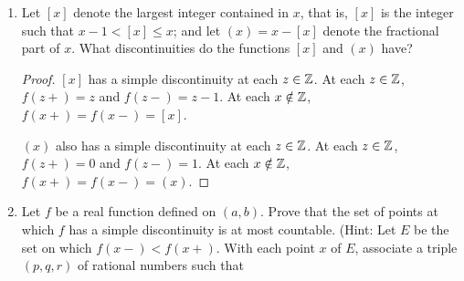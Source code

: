 \documentclass[../psets.tex]{subfiles}
\begin{document}
\begin{enumerate}[label={\textbf{\arabic*.}}]
\begin{proof}
        We will first prove that $f$ is 1-1. Suppose $x\neq y$, and WLOG let $x<y$. We seek to demonstrate that $f((x,y))=(c,d)$ where $c,d\in\R$ are distinct, and that $f([x,y])=[c,d]$; it will follow that $f(x)=c$ and $f(y)=d$ or vice versa, proving either way that $f(x)\neq f(y)$ as desired. Let's begin. To demonstrate the first claim, it will suffice to show that $f((x,y))$ is open, connected, and bounded. Since $f$ is open, $f((x,y))$ is open. Since $f$ is continuous and $(x,y)$ is connected, Theorem 4.22 asserts that $f((x,y))$ is connected. Since $f$ is continuous and $[x,y]$ is compact, Theorem 4.19 asserts that $f$ is uniformly continuous on $[x,y]$; hence $f$ is bounded on $(x,y)$ by Exercise 4.8, as desired. On the other hand, to demonstrate the second claim, it will suffice to show that $f([x,y])$ is compact and connected. Since $f$ is continuous and $[x,y]$ is compact, Theorem 4.14 implies that $f([x,y])$ is compact. Since $f$ is continuous and $[x,y]$ is connected, Theorem 4.22 implies that $f([x,y])$ is connected, as desired.\par
        Now suppose for the sake of contradiction that $f$ is not monotonic. Then there exist $x<y<z$ such that $f(x)<f(y)$ and $f(y)>f(z)$ (or, symmetrically, such that $f(x)>f(y)$ and $f(y)<f(z)$). Since $f$ is 1-1 and $x\neq z$, $f(x)\neq f(z)$. We divide into two cases ($f(x)<f(z)$ and $f(x)>f(z)$). If $f(x)<f(z)$, then $f(x)<f(z)<f(y)$ by hypothesis. Thus, since $f$ is a continuous real function on $[x,y]$ and $f(x)<f(z)<f(y)$, Theorem 4.23 asserts that there exists a $c\in(x,y)$ such that $f(c)=f(z)$. But since $f$ is 1-1, this implies that $c=z$, meaning that $x<z<y$, a contradiction. The proof of the other case is symmetric.
    \end{proof}
    \item Let $[x]$ denote the largest integer contained in $x$, that is, $[x]$ is the integer such that $x-1<[x]\leq x$; and let $(x)=x-[x]$ denote the fractional part of $x$. What discontinuities do the functions $[x]$ and $(x)$ have?
    \begin{proof}
        $[x]$ has a simple discontinuity at each $z\in\mathbb{Z}$. At each $z\in\mathbb{Z}$, $f(z+)=z$ and $f(z-)=z-1$. At each $x\notin\mathbb{Z}$, $f(x+)=f(x-)=[x]$.\par
        $(x)$ also has a simple discontinuity at each $z\in\mathbb{Z}$. At each $z\in\mathbb{Z}$, $f(z+)=0$ and $f(z-)=1$. At each $x\notin\mathbb{Z}$, $f(x+)=f(x-)=(x)$.
    \end{proof}
    \item Let $f$ be a real function defined on $(a,b)$. Prove that the set of points at which $f$ has a simple discontinuity is at most countable. (Hint: Let $E$ be the set on which $f(x-)<f(x+)$. With each point $x$ of $E$, associate a triple $(p,q,r)$ of rational numbers such that

\end{enumerate}
\end{document}
